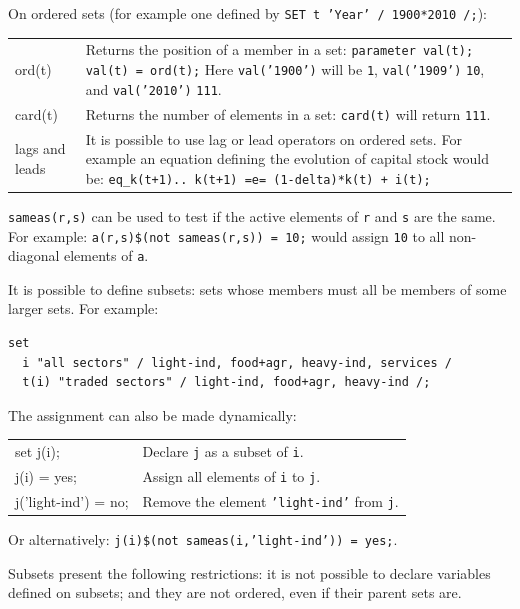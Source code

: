 \documentclass[10pt,landscape,a4paper]{article}
\begin{document}
\begin{multicols}{2}
On ordered sets (for example one defined by \texttt{SET t 'Year' / 1900*2010 /;}):
\begin{tabularx}{\columnwidth}{@{}>{\ttfamily}l>{\raggedright\arraybackslash}X@{}}
ord(t)& Returns the position of a member in a set:\linebreak{}
\texttt{parameter val(t);}\linebreak{}
\texttt{val(t) = ord(t);}\linebreak{}
Here \texttt{val('1900')} will be \texttt{1}, \texttt{val('1909')} \texttt{10}, and \texttt{val('2010')} \texttt{111}.\\
card(t) & Returns the number of elements in a set: \texttt{card(t)} will return \texttt{111}.\\
\textrm{lags and leads} & It is possible to use lag or lead operators on ordered
sets. For example an equation defining the evolution of capital stock would
be:\linebreak{}
\texttt{eq\_k(t+1).. k(t+1) =e= (1-delta)*k(t) + i(t);}
\end{tabularx}

\texttt{sameas(r,s)} can be used to test if the active elements of \texttt{r}
and \texttt{s} are the same. For example: \texttt{a(r,s)\$(not sameas(r,s)) =
  10;} would assign \texttt{10} to all non-diagonal elements of \texttt{a}.

It is possible to define subsets: sets whose members must all be members of some
larger sets. For example:\\
\begin{verbatim}
set
  i "all sectors" / light-ind, food+agr, heavy-ind, services /
  t(i) "traded sectors" / light-ind, food+agr, heavy-ind /;
\end{verbatim}
The assignment can also be made dynamically:
\begin{tabularx}{\columnwidth}{@{}>{\ttfamily}l>{\raggedright\arraybackslash}X@{}}
set j(i);& Declare \texttt{j} as a subset of \texttt{i}. \\
j(i) = yes;& Assign all elements of \texttt{i} to \texttt{j}.\\
j('light-ind') = no;& Remove the element \texttt{'light-ind'} from \texttt{j}.
\end{tabularx}
Or alternatively: \texttt{j(i)\$(not sameas(i,'light-ind')) = yes;}.

Subsets present the following restrictions: it is not possible to declare
variables defined on subsets; and they are not ordered, even if their parent
sets are.


\end{multicols}
\end{document}
